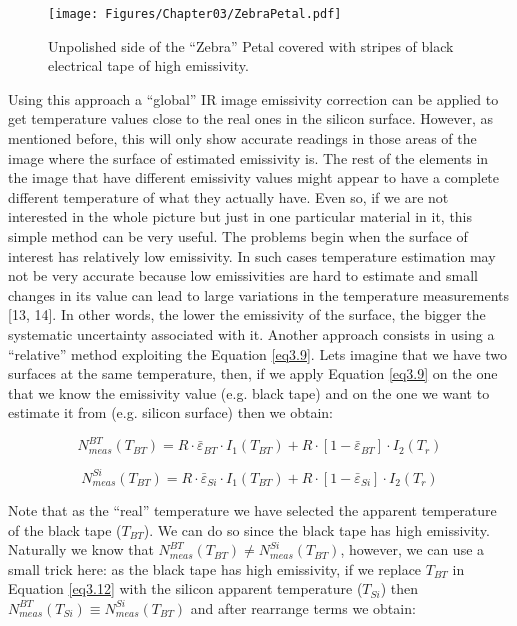			\begin{figure}[ht!]
				\centering
				\captionsetup{justification=centering,margin=2cm}
				\texttt{[image: Figures/Chapter03/ZebraPetal.pdf]}
				\caption{Unpolished side of the “Zebra” Petal covered with stripes of black electrical tape of high emissivity.}\label{fig3.6}
			\end{figure}
			
			Using this approach a “global” IR image emissivity correction can be applied to get temperature values close to the real ones in the silicon surface. However, as mentioned before, this will only show accurate readings in those areas of the image where the surface of estimated emissivity is. The rest of the elements in the image that have different emissivity values might appear to have a complete different temperature of what they actually have. Even so, if we are not interested in the whole picture but just in one particular material in it, this simple method can be very useful. The problems begin when the surface of interest has relatively low emissivity. In such cases temperature estimation may not be very accurate because low emissivities are hard to estimate and small changes in its value can lead to large variations in the temperature measurements [13, 14]. In other words, the lower the emissivity of the surface, the bigger the systematic uncertainty associated with it.
			Another approach consists in using a “relative” method exploiting the Equation \ref{eq3.9}. Lets imagine that we have two surfaces at the same temperature, then, if we apply Equation \ref{eq3.9} on the one that we know the emissivity value (e.g. black tape) and on the one we want to estimate it from (e.g. silicon surface) then we obtain:
			
			\begin{equation}\label{eq3.12}
				N^{BT}_{meas}(T_{BT})= R \cdot \bar{\varepsilon}_{BT} \cdot I_{1}(T_{BT}) + R \cdot [1- \bar{\varepsilon}_{BT}] \cdot I_{2}(T_{r})
			\end{equation}
			
			\begin{equation}\label{eq3.13}
				N^{Si}_{meas}(T_{BT})= R \cdot \bar{\varepsilon}_{Si} \cdot I_{1}(T_{BT}) + R \cdot [1- \bar{\varepsilon}_{Si}] \cdot I_{2}(T_{r})
			\end{equation}
			
			Note that as the “real” temperature we have selected the apparent temperature of the black tape ($T_{BT}$). We can do so since the black tape has high emissivity. Naturally we know that $N^{BT}_{meas}(T_{BT}) \neq N^{Si}_{meas}(T_{BT})$, however, we can use a small trick here: as the black tape has high emissivity, if we replace $T_{BT}$ in Equation \ref{eq3.12} with the silicon apparent temperature ($T_{Si}$) then $N^{BT}_{meas}(T_{Si}) \equiv N^{Si}_{meas}(T_{BT})$ and after rearrange terms we obtain:
			
